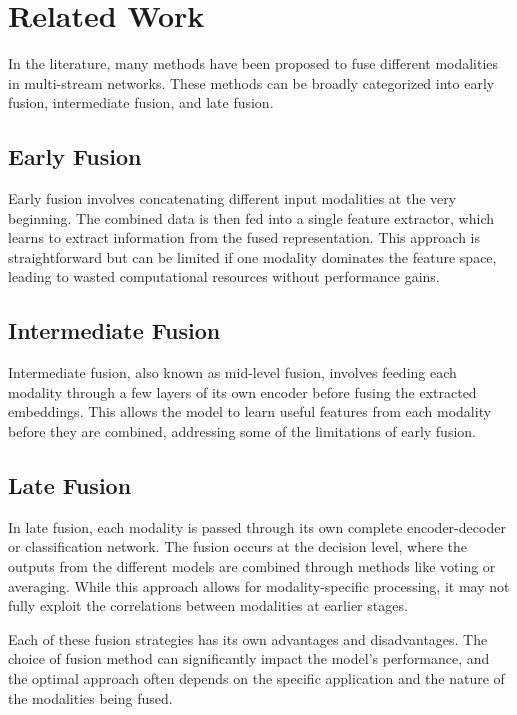 \section{Related Work}

In the literature, many methods have been proposed to fuse different modalities in multi-stream networks. These methods can be broadly categorized into early fusion, intermediate fusion, and late fusion.

\subsection{Early Fusion}
Early fusion involves concatenating different input modalities at the very beginning. The combined data is then fed into a single feature extractor, which learns to extract information from the fused representation. This approach is straightforward but can be limited if one modality dominates the feature space, leading to wasted computational resources without performance gains.

\subsection{Intermediate Fusion}
Intermediate fusion, also known as mid-level fusion, involves feeding each modality through a few layers of its own encoder before fusing the extracted embeddings. This allows the model to learn useful features from each modality before they are combined, addressing some of the limitations of early fusion.

\subsection{Late Fusion}
In late fusion, each modality is passed through its own complete encoder-decoder or classification network. The fusion occurs at the decision level, where the outputs from the different models are combined through methods like voting or averaging. While this approach allows for modality-specific processing, it may not fully exploit the correlations between modalities at earlier stages.

Each of these fusion strategies has its own advantages and disadvantages. The choice of fusion method can significantly impact the model's performance, and the optimal approach often depends on the specific application and the nature of the modalities being fused.
